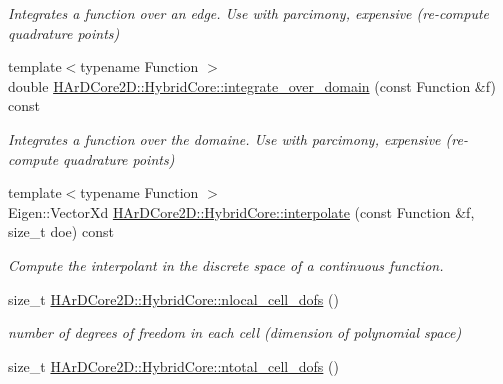 \begin{DoxyCompactItemize}
\begin{DoxyCompactList}\small\item\em Integrates a function over an edge. Use with parcimony, expensive (re-\/compute quadrature points) \end{DoxyCompactList}\item 
\mbox{\label{group__HybridCore2D_gab058c4e54d1e33c49e537b8d0f602848}} 
{\footnotesize template$<$typename Function $>$ }\\double \hyperlink{group__HybridCore2D_gab058c4e54d1e33c49e537b8d0f602848}{H\+Ar\+D\+Core2\+D\+::\+Hybrid\+Core\+::integrate\+\_\+over\+\_\+domain} (const Function \&f) const
\begin{DoxyCompactList}\small\item\em Integrates a function over the domaine. Use with parcimony, expensive (re-\/compute quadrature points) \end{DoxyCompactList}\item 
\mbox{\label{group__HybridCore2D_ga71c953efc96f467cb24faa1b60ee9bb2}} 
{\footnotesize template$<$typename Function $>$ }\\Eigen\+::\+Vector\+Xd \hyperlink{group__HybridCore2D_ga71c953efc96f467cb24faa1b60ee9bb2}{H\+Ar\+D\+Core2\+D\+::\+Hybrid\+Core\+::interpolate} (const Function \&f, size\+\_\+t doe) const
\begin{DoxyCompactList}\small\item\em Compute the interpolant in the discrete space of a continuous function. \end{DoxyCompactList}\item 
\mbox{\label{group__HybridCore2D_ga6faceb46cc896cd6d82a821828518730}} 
size\+\_\+t \hyperlink{group__HybridCore2D_ga6faceb46cc896cd6d82a821828518730}{H\+Ar\+D\+Core2\+D\+::\+Hybrid\+Core\+::nlocal\+\_\+cell\+\_\+dofs} ()
\begin{DoxyCompactList}\small\item\em number of degrees of freedom in each cell (dimension of polynomial space) \end{DoxyCompactList}\item 
\mbox{\label{group__HybridCore2D_gaf97e3efcc37ac51074c7136af3ca517b}} 
size\+\_\+t \hyperlink{group__HybridCore2D_gaf97e3efcc37ac51074c7136af3ca517b}{H\+Ar\+D\+Core2\+D\+::\+Hybrid\+Core\+::ntotal\+\_\+cell\+\_\+dofs} ()

\end{DoxyCompactItemize}

